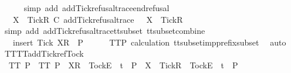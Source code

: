 \ \ \ \ \isamarkupfalse%
\ {\isacharparenleft}simp\ add{\isacharcolon}\ add{\isacharunderscore}Tick{\isacharunderscore}refusal{\isacharunderscore}trace{\isacharunderscore}end{\isacharunderscore}refusal{\isacharparenright}\isanewline
\ \ \isamarkupfalse%
\ \isamarkupfalse%
\ {\isachardoublequoteopen}{\isasymrho}\ {\isacharat}\ {\isacharbrackleft}{\isacharbrackleft}X\ {\isasymunion}\ {\isacharbraceleft}Tick{\isacharbraceright}{\isacharbrackright}\isactrlsub R{\isacharbrackright}\ {\isasymsubseteq}\isactrlsub C\ add{\isacharunderscore}Tick{\isacharunderscore}refusal{\isacharunderscore}trace\ {\isasymrho}\ {\isacharat}\ {\isacharbrackleft}{\isacharbrackleft}X\ {\isasymunion}\ {\isacharbraceleft}Tick{\isacharbraceright}{\isacharbrackright}\isactrlsub R{\isacharbrackright}{\isachardoublequoteclose}\isanewline
\ \ \ \ \isamarkupfalse%
\ {\isacharparenleft}simp\ add{\isacharcolon}\ add{\isacharunderscore}Tick{\isacharunderscore}refusal{\isacharunderscore}trace{\isacharunderscore}tt{\isacharunderscore}subset\ tt{\isacharunderscore}subset{\isacharunderscore}combine{\isacharparenright}\isanewline
\ \ \isamarkupfalse%
\ \isamarkupfalse%
\ {\isachardoublequoteopen}{\isasymrho}\ {\isacharat}\ {\isacharbrackleft}{\isacharbrackleft}insert\ Tick\ X{\isacharbrackright}\isactrlsub R{\isacharbrackright}\ {\isasymin}\ P{\isachardoublequoteclose}\isanewline
\ \ \ \ \isamarkupfalse%
\ TT{}{\isacharunderscore}P\ calculation\ tt{\isacharunderscore}subset{\isacharunderscore}imp{\isacharunderscore}prefix{\isacharunderscore}subset\ \isamarkupfalse%
\ auto\isanewline
{}\isamarkupfalse%
%
\endisatagproof
{\isafoldproof}%
%
\isadelimproof
\isanewline
%
\endisadelimproof
\isanewline
{}\isamarkupfalse%
\ TT{}{\isacharunderscore}TT{}{\isacharunderscore}add{\isacharunderscore}Tick{\isacharunderscore}ref{\isacharunderscore}Tock{\isacharcolon}\isanewline
\ \ {\isachardoublequoteopen}TT{}\ P\ {\isasymLongrightarrow}\ TT{}\ P\ {\isasymLongrightarrow}\ {\isacharbrackleft}X{\isacharbrackright}\isactrlsub R\ {\isacharhash}\ {\isacharbrackleft}Tock{\isacharbrackright}\isactrlsub E\ {\isacharhash}\ t\ {\isasymin}\ P\ {\isasymLongrightarrow}\ {\isacharbrackleft}X\ {\isasymunion}\ {\isacharbraceleft}Tick{\isacharbraceright}{\isacharbrackright}\isactrlsub R\ {\isacharhash}\ {\isacharbrackleft}Tock{\isacharbrackright}\isactrlsub E\ {\isacharhash}\ t\ {\isasymin}\ P{\isachardoublequoteclose}\isanewline
